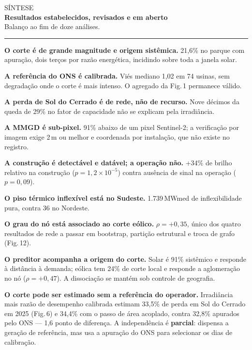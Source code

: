 \documentclass[10pt]{article}
\newcommand{\cab}[3]{%
  {\color{claro}\footnotesize\textsf{#1}}\\[-2pt]
  {\LARGE\textbf{#2}}\\[2pt]
  {\color{cinza}\small #3}\par\vspace{4pt}
  {\color{claro}\rule{\linewidth}{0.4pt}}\par\vspace{5pt}}
\newcommand{\bloco}[1]{\vspace{2pt}{\color{vermelho}\footnotesize\textbf{#1}}\par\vspace{-2pt}}
\begin{document}
\cab{SÍNTESE}{Resultados estabelecidos, revisados e em aberto}{Balanço ao fim de doze análises.}

\begin{minipage}[t]{0.315\linewidth}\vspace{0pt}\small
\bloco{Estabelecido}
\textbf{O corte é de grande magnitude e origem sistêmica.} 21,6\% no parque com
apuração, dois terços por razão energética, incidindo sobre toda a janela solar.

\textbf{A referência do ONS é calibrada.} Viés mediano 1,02 em 74 usinas, sem
degradação onde o corte é mais intenso. O agregado da Fig.\,1 permanece válido.

\textbf{A perda de Sol do Cerrado é de rede, não de recurso.} Nove décimos da queda de
29\% no fator de capacidade não se explicam pela irradiância.

\textbf{A MMGD é sub-pixel.} 91\% abaixo de um pixel Sentinel-2; a verificação por
imagem exige 2\,m ou melhor e coordenada por instalação, que não existe no registro.

\textbf{A construção é detectável e datável; a operação não.} +34\% de brilho relativo
na construção ($p=1{,}2\times10^{-5}$) contra ausência de sinal na operação
($p=0{,}09$).

\textbf{O piso térmico inflexível está no Sudeste.} 1.739\,MWmed de inflexibilidade
pura, contra 36 no Nordeste.

\textbf{O grau do nó está associado ao corte eólico.} $\rho = +0{,}35$, único dos quatro
resultados de rede a passar em bootstrap, partição estrutural e troca de grafo
(Fig.\,12).

\textbf{O preditor acompanha a origem do corte.} Solar é 91\% sistêmico e responde à
distância à demanda; eólica tem 24\% de corte local e responde a aglomeração no nó
($\rho = +0{,}47$). A dissociação se mantém sob controle de geografia.

\textbf{O corte pode ser estimado sem a referência do operador.} Irradiância mais razão
de desempenho calibrada estimam 33,5\% de perda em Sol do Cerrado em 2025 (Fig.\,6) e
34,4\% com o passo de área acoplado, contra 32,8\% apurados pelo ONS --- 1,6 ponto de
diferença. A independência é \textbf{parcial}: dispensa a geração de referência, mas usa
a apuração do ONS para selecionar os dias de calibração.
\end{minipage}\hfill
\end{document}
